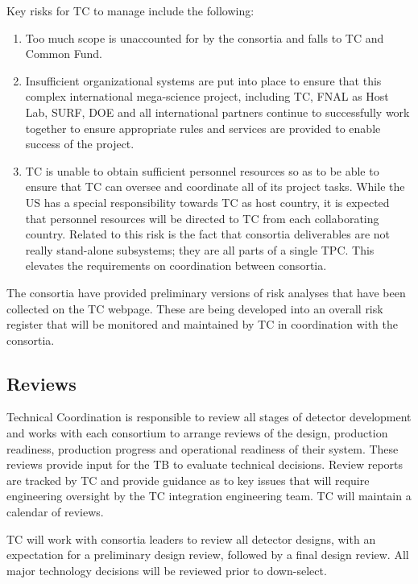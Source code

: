 Key risks for TC to manage include the following:
\begin{enumerate}
    \item Too much scope is unaccounted for by the consortia and falls
      to TC and Common Fund.
    \item Insufficient organizational systems are put into place to
      ensure that this complex international mega-science project,
      including TC, FNAL as Host Lab, SURF, DOE and all international
      partners continue to successfully work together to ensure
      appropriate rules and services are provided to enable success of
      the project.
  \item TC is unable to obtain sufficient personnel resources so as to
    be able to ensure that TC can oversee and coordinate all of its
    project tasks.  While the US has a special responsibility towards
    TC as host country, it is expected that personnel resources will
    be directed to TC from each collaborating country. Related to this
    risk is the fact that consortia deliverables are not really
    stand-alone subsystems; they are all parts of a single TPC. This
    elevates the requirements on coordination between consortia.
\end{enumerate}

The consortia have provided preliminary versions of risk analyses that
have been collected on the TC webpage. These are being developed into
an overall risk register that will be monitored and maintained by TC
in coordination with the consortia.

\subsection{Reviews}
\label{sec:fdsp-coord-reviews}

Technical Coordination is responsible to review all stages of detector
development and works with each consortium to arrange reviews of the
design, production readiness, production progress and operational
readiness of their system.  These reviews provide input for the TB to
evaluate technical decisions.  Review reports are tracked by TC and
provide guidance as to key issues that will require engineering
oversight by the TC integration engineering team. TC will maintain a
calendar of  reviews.

TC will work with consortia leaders to review all detector designs,
with an expectation for a preliminary design review, followed by a
final design review. All major technology decisions will be reviewed
prior to down-select.

